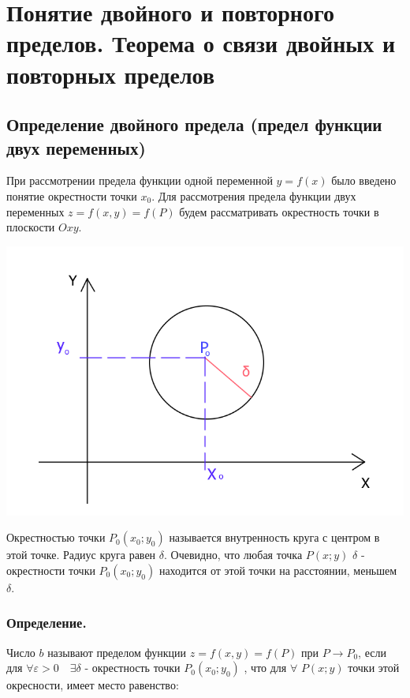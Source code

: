 \section{Понятие двойного и повторного пределов. Теорема о связи
двойных и повторных пределов}

\subsection{Определение двойного предела (предел функции двух
переменных)}

При рассмотрении предела функции одной переменной \(y=f(x)\) было
введено понятие окрестности точки \(x_{0}\). Для рассмотрения предела
функции двух переменных \(z=f\left(x, y\right)=f(P)\) будем
рассматривать окрестность точки в плоскости \(Oxy\).

\includegraphics[width=\linewidth]{10img.png}

Окрестностью точки \(P_{0}\left(x_{0}; y_{0}\right)\) называется
внутренность круга с центром в этой точке. Радиус круга равен
\(\delta\). Очевидно, что любая точка \(P\left(x; y\right)\) \(\delta\)
- окрестности точки \(P_{0}\left(x_{0}; y_{0}\right)\) находится от этой
точки на расстоянии, меньшем \(\delta\).

\subsubsection{Определение.}

Число \(b\) называют пределом функции \(z=f(x, y)=f(P)\) при
\(P \rightarrow P_{0}\), если для
\(\forall \varepsilon>0 \quad \exists \delta\) - окрестность точки
\(P_{0}\left(x_{0}; y_{0}\right)\) , что для \(\forall\)
\(P\left(x; y\right)\) точки этой окресности, имеет место равенство:

